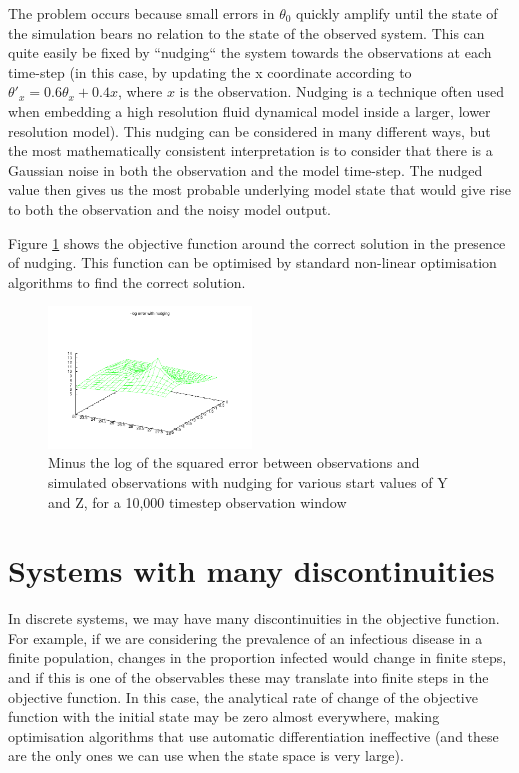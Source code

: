 \documentclass[letterpaper,twocolumn,10pt]{article}
\begin{document}
The problem occurs because small errors in $\theta_0$ quickly amplify until the state of the simulation bears no relation to the state of the observed system. This can quite easily be fixed by ``nudging`` the system towards the observations at each time-step (in this case, by updating the x coordinate according to $\theta'_{x}=0.6\theta_x + 0.4x$, where $x$ is the observation. Nudging is a technique often used when embedding a high resolution fluid dynamical model inside a larger, lower resolution model). This nudging can be considered in many different ways, but the most mathematically consistent interpretation is to consider that there is a Gaussian noise in both the observation and the model time-step. The nudged value then gives us the most probable underlying model state that would give rise to both the observation and the noisy model output.

Figure \ref{withNudging} shows the objective function around the correct solution in the presence of nudging. This function can be optimised by standard non-linear optimisation algorithms to find the correct solution.

\begin{figure}
\includegraphics[width=0.48\textwidth]{nudgingOut.pdf}
\caption{Minus the log of the squared error between observations and simulated observations with nudging for various start values of Y and Z, for a 10,000 timestep observation window}
\label{withNudging}
\end{figure}

\section{Systems with many discontinuities}

In discrete systems, we may have many discontinuities in the objective function. For example, if we are considering the prevalence of an infectious disease in a finite population, changes in the proportion infected would change in finite steps, and if this is one of the observables these may translate into finite steps in the objective function. In this case, the analytical rate of change of the objective function with the initial state may be zero almost everywhere, making optimisation algorithms that use automatic differentiation ineffective (and these are the only ones we can use when the state space is very large).
\end{document}

